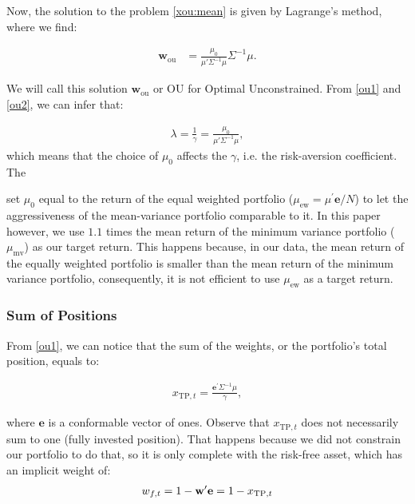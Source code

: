 \documentclass[12pt,oneside,a4paper]{memoir}
\begin{document}
\noindent
Now, the solution to the problem \eqref{xou:mean} is given by Lagrange's method, where we find:

\vspace{-12pt}
\begin{align}
\label{ou2}
\mathbf{w}_{\mathrm{ou}}  &= \frac{\mu_{0}}{\mu' \Sigma^{-1} \mu} \Sigma^{-1} \mu.
\end{align}

\noindent
We will call this solution $\mathbf{w}_{\mathrm{ou}} $ or OU for Optimal Unconstrained. From \eqref{ou1} and \eqref{ou2}, we can infer that:

\vspace{-12pt}
\begin{align}
\label{lambda-ou}
 \lambda = \frac{1}{\gamma} = \frac{\mu_{0}}{\mu' \Sigma^{-1} \mu},
\end{align}
which means that the choice of \(\mu_{0}\) affects the \(\gamma\), i.e. the risk-aversion coefficient.
The 

 set \(\mu_{0}\) equal to the return of the equal weighted portfolio (\(\mu_{\mathrm{ew}}=\mu^{\prime} \mathbf{e}/N\)) to let the aggressiveness of the mean-variance portfolio comparable to it. In this paper however, we use $1.1$ times the mean return of the minimum variance portfolio ($\mu_{\mathrm{mv}}$) as our target return. This happens because, in our data, the mean return of the equally weighted portfolio is smaller than the mean return of the minimum variance portfolio, consequently, it is not efficient to use $\mu_{\mathrm{ew}}$ as a target return.

\subsubsection*{Sum of Positions}

From \eqref{ou1}, we can notice that the sum of the weights, or the portfolio's total position, equals to:

\begin{align*}
x_{\mathrm{TP},t} =\frac{ \mathbf{e}^{\prime} \Sigma^{-1} \mu }{\gamma},
\end{align*}

\noindent
where $\mathbf{e}$ is a conformable vector of ones. Observe that \(x_{\mathrm{TP},t}\) does not necessarily sum to one (fully invested position). That happens because we did not constrain our portfolio to do that, so it is only complete with the risk-free asset, which has an implicit weight of:
\begin{align}
    \notag
	w_{f,t} = 1 - \mathbf{w}^{\prime}  \mathbf{e}  = 1 -x_{\mathrm{TP},t}
\end{align}
\end{document}
